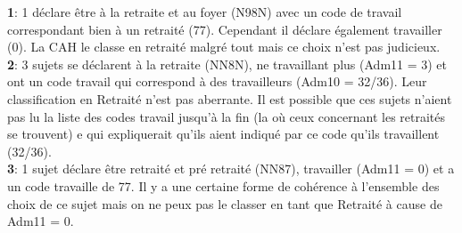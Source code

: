 \documentclass{book}
\begin{document}

\bigskip

\noindent
\textbf{1}: 1 déclare être à la retraite et au foyer (N98N) avec un code de travail correspondant bien à un retraité (77). Cependant il déclare également travailler (0). La CAH le classe en retraité malgré tout mais ce choix n'est pas judicieux.\\
\textbf{2}: 3 sujets se déclarent à la retraite (NN8N), ne travaillant plus (Adm11 = 3) et ont un code travail qui correspond à des travailleurs (Adm10 = 32/36). Leur classification en Retraité n'est pas aberrante. Il est possible que ces sujets n'aient pas lu la liste des codes travail jusqu'à la fin (la où ceux concernant les retraités se trouvent) e qui expliquerait qu'ils aient indiqué par ce code qu'ils travaillent (32/36).\\
\textbf{3}: 1 sujet déclare être retraité et pré retraité (NN87), travailler (Adm11 = 0) et a un code travaille de 77. Il y a une certaine forme de cohérence à l'ensemble des choix de ce sujet mais on ne peux pas le classer en tant que Retraité à cause de Adm11 = 0. 
\end{document}
